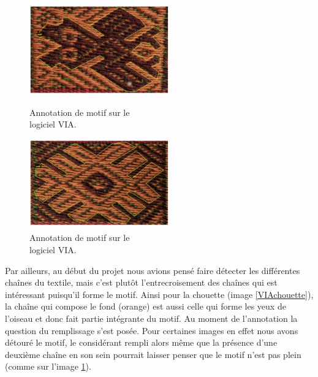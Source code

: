 \documentclass[a4paper, twoside, 12pt]{book}
\begin{document}
\begin{figure}[!h]
    \begin{minipage}[c]{.5\linewidth}
            \begin{center}
                \includegraphics[width=6cm]{images/annotations.png}
                \caption[Annotation de motif]{Annotation de motif sur le \\ logiciel VIA.}
                \label{VIAchouette}
            \end{center}
    \end{minipage}
    \begin{minipage}[c]{.5\linewidth}
        \begin{center}
            \includegraphics[width=6cm]{images/ambiguAnnotations.png}
            \caption[Annotation de motif]{Annotation de motif sur le \\logiciel VIA.}
            \label{VIAambi}
        \end{center}
    \end{minipage}
\end{figure}

Par ailleurs, au début du projet nous avions pensé faire détecter les différentes chaînes du textile, mais c'est plutôt l'entrecroisement des chaînes qui est intéressant puisqu'il forme le motif. Ainsi pour la chouette (image \ref{VIAchouette}), la chaîne qui compose le fond (orange) est aussi celle qui forme les yeux de l'oiseau et donc fait partie intégrante du motif. Au moment de l'annotation la question du remplissage s'est posée. Pour certaines images en effet nous avons détouré le motif, le considérant rempli alors même que la présence d'une deuxième chaîne en son sein pourrait laisser penser que le motif n'est pas plein (comme sur l'image \ref{VIAambi}). \\
\end{document}
